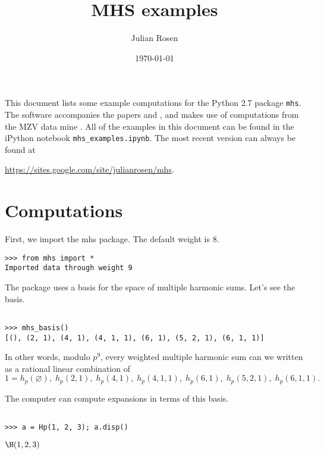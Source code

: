 \documentclass[12pt]{amsart}
\theoremstyle{plain}
\theoremstyle{definition}
\theoremstyle{remark}
\def\hp{h_{p}}
\begin{document}
\title{MHS examples}
\author{Julian Rosen}
\date{\today}
\maketitle

This document lists some example computations for the Python 2.7 package \verb|mhs|. The software accompanies the papers \cite{Ros16a} and \cite{Ros18}, and makes use of computations from the MZV data mine \cite{Blu10}. All of the examples in this document can be found in the iPython notebook \verb|mhs_examples.ipynb|. The most recent version can always be found at
\begin{center}
\url{https://sites.google.com/site/julianrosen/mhs}.
\end{center}

\section{Computations}


\noindent First, we import the mhs package. The default weight is $8$.
\bigskip

\begin{verbatim}
>>> from mhs import *
Imported data through weight 9
\end{verbatim}
\bigskip

\noindent The package uses a basis for the space of multiple harmonic sums. Let's see the basis.

\begin{verbatim}

>>> mhs_basis()
[(), (2, 1), (4, 1), (4, 1, 1), (6, 1), (5, 2, 1), (6, 1, 1)]

\end{verbatim}

\noindent In other words, modulo $p^9$, every weighted multiple harmonic sum can we written as a rational linear combination of
\[
1=\hp(\varnothing),\; \hp(2,1),\;\hp(4,1),\;\hp(4,1,1),\;\hp(6,1),\;\hp(5,2,1),\;\hp(6,1,1).
\]
\bigskip

\noindent The computer can compute expansions in terms of this basis.

\begin{verbatim}

>>> a = Hp(1, 2, 3); a.disp()
\end{verbatim}
$\displaystyle\H(1,2,3)$
\end{document}
